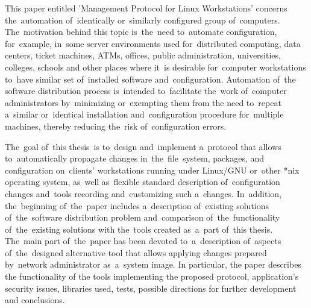 \documentclass[12pt,a4paper]{article}
\begin{document}
This paper entitled 'Management Protocol for Linux Workstations' concerns the~automation of~identically or~similarly configured group of~computers. The~motivation behind this topic is~the~need to~automate configuration, for~example, in~some server environments used for~distributed computing, data centers, ticket machines, ATMs, offices, public administration, universities, colleges, schools and other places where it~is desirable for~computer workstations to~have similar set of~installed software and~configuration. Automation of~the software distribution process is~intended to~facilitate the~work of~computer administrators by~minimizing or~exempting them from the need to~repeat a~similar or~identical installation and~configuration procedure for~multiple machines, thereby reducing the~risk of~configuration errors.

The~goal of~this thesis~is to~design and~implement a~protocol that allows to~automatically propagate changes in~the~file~system, packages, and configuration on~clients' workstations running under Linux/GNU or~other *nix operating system, as~well as~flexible standard description of~configuration changes and~tools recording and~customizing such a~changes. In~addition, the~beginning of~the~paper includes a~description of~existing solutions of~the~software distribution problem and~comparison of~the~functionality of~the~existing solutions with the~tools created as~a~part of~this thesis. The~main part of~the~paper has been devoted to~a~description of~aspects of~the~designed alternative tool that allows applying changes prepared by~network administrator as~a~system image. In particular, the paper describes the functionality of the tools implementing the proposed protocol, application's security issues, libraries used, tests, possible directions for further development and conclusions.
\end{document}
